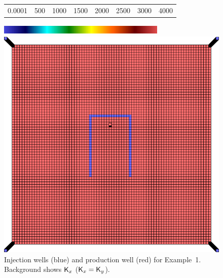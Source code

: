 \documentclass[twocolumn,numbook]{svjour3}          %
\begin{document}
\begin{figure}[ht]
\begin{center}
     \begin{tabular}{cccccccc}
      0.0001 &  500 & 1000 & 1500 & 2000 & 2500 & 3000 &4000
      \end{tabular}
      \includegraphics[width=8cm, height=0.5cm]{VanEssenModelPermeabilityMapColorBar.png}
       
       \medskip

       \includegraphics[totalheight=3.in]{PiPermeabilityMapAndWells.png} 
       \end{center}
     \caption{Injection wells (blue) and production well (red) for Example~1. Background shows $\mathsf{K}_x$ ($ \mathsf{K}_x = \mathsf{K}_y$).}
  \label{fig:PImodelPermeabilityMapAndWells}
\end{figure}
\end{document}
